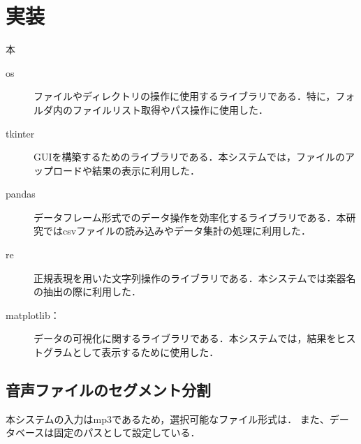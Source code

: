 \section{実装}
本

\begin{description}
	\item[os] ファイルやディレクトリの操作に使用するライブラリである．特に，フォルダ内のファイルリスト取得やパス操作に使用した．

	\item[tkinter] GUIを構築するためのライブラリである．本システムでは，ファイルのアップロードや結果の表示に利用した．

	\item[pandas] データフレーム形式でのデータ操作を効率化するライブラリである．本研究ではcsvファイルの読み込みやデータ集計の処理に利用した．

	\item[re] 正規表現を用いた文字列操作のライブラリである．本システムでは楽器名の抽出の際に利用した．

	\item[matplotlib：] データの可視化に関するライブラリである．本システムでは，結果をヒストグラムとして表示するために使用した．

\end{description}

\subsection{音声ファイルのセグメント分割}


本システムの入力はmp3であるため，選択可能なファイル形式は．
また、データベースは固定のパスとして設定している．

